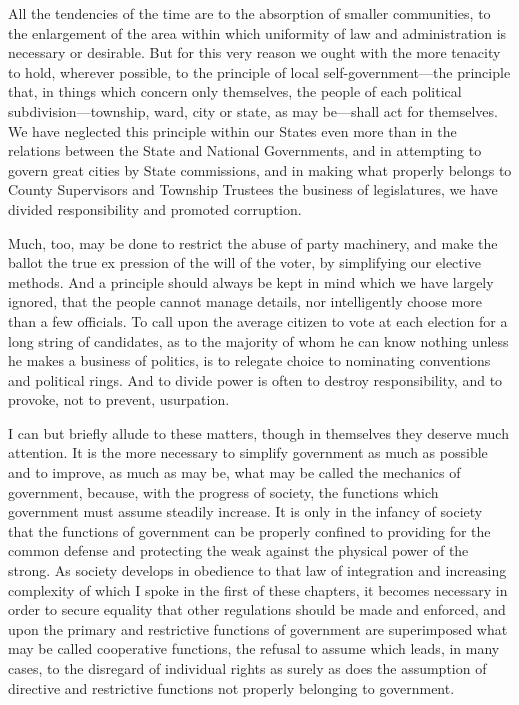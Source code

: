 \documentclass{book}
\begin{document}
All the tendencies of the time are to the absorption of smaller communities, to the enlargement of the area within which uniformity of law and administration is necessary or desirable. But for this very reason we ought with the more tenacity to hold, wherever possible, to the principle of local self-government—the principle that, in things which concern only themselves, the people of each political subdivision—township, ward, city or state, as may be—shall act for themselves. We have neglected this principle within our States even more than in the relations between the State and National Governments, and in attempting to govern great cities by State commissions, and in making what properly belongs to County Supervisors and Township Trustees the business of legislatures, we have divided responsibility and promoted corruption.

Much, too, may be done to restrict the abuse of party machinery, and make the ballot the true ex pression of the will of the voter, by simplifying our elective methods. And a principle should always be kept in mind which we have largely ignored, that the people cannot manage details, nor intelligently choose more than a few officials. To call upon the average citizen to vote at each election for a long string of candidates, as to the majority of whom he can know nothing unless he makes a business of politics, is to relegate choice to nominating conventions and political rings. And to divide power is often to destroy responsibility, and to provoke, not to prevent, usurpation.

I can but briefly allude to these matters, though in themselves they deserve much attention. It is the more necessary to simplify government as much as possible and to improve, as much as may be, what may be called the mechanics of government, because, with the progress of society, the functions which government must assume steadily increase. It is only in the infancy of society that the functions of government can be properly confined to providing for the common defense and protecting the weak against the physical power of the strong. As society develops in obedience to that law of integration and increasing complexity of which I spoke in the first of these chapters, it becomes necessary in order to secure equality that other regulations should be made and enforced, and upon the primary and restrictive functions of government are superimposed what may be called cooperative functions, the refusal to assume which leads, in many cases, to the disregard of individual rights as surely as does the assumption of directive and restrictive functions not properly belonging to government.
\end{document}
